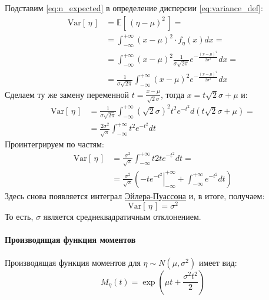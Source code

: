 \documentclass[
  russian,
  a4paper,
]{article}
\let\oldparagraph\paragraph
\renewcommand{\paragraph}[1]{\oldparagraph{#1}\mbox{}}
\begin{document}
Подставим \ref{eq:n_expected} в определение дисперсии
\ref{eq:variance_def}: \[\begin{aligned}
    \mathrm{Var}\left[\, \eta \,\right] &= \mathbb{E}\left[\, (\eta - \mu)^2 \,\right] =\\
               &= \int_{-\infty}^{+\infty} (x-\mu)^2 \cdot f_{\eta}(x)dx =\\
               &= \int_{-\infty}^{+\infty}(x-\mu)^2 \frac{1}{\sigma\sqrt{2\pi}}e^{-\frac{(x-\mu)^2}{2\sigma^2}}dx =\\
               &= \frac{1}{\sigma\sqrt{2\pi}}\int_{-\infty}^{+\infty}(x-\mu)^2 e^{-\frac{(x-\mu)^2}{2\sigma^2}}dx
\end{aligned}\] Сделаем ту же замену переменной
\(t = \frac{x-\mu}{\sqrt{2}\sigma}\), тогда \(x = t\sqrt{2}\sigma+\mu\)
и: \[\begin{aligned}
    \mathrm{Var}\left[\, \eta \,\right] &= \frac{1}{\sigma\sqrt{2\pi}}
                \int_{-\infty}^{+\infty}(\sqrt{2}\sigma)^2 t^2 e^{-t^2}d(t\sqrt{2}\sigma+\mu) =\\
               &= \frac{2\sigma^2}{\sqrt{\pi}}\int_{-\infty}^{+\infty}t^2 e^{-t^2}dt
\end{aligned}\] Проинтегрируем по частям: \[\begin{aligned}
    \mathrm{Var}\left[\, \eta \,\right] &= \frac{\sigma^2}{\sqrt{\pi}}\int_{-\infty}^{+\infty}t 2t e^{-t^2} dt =\\
               &= \frac{\sigma^2}{\sqrt{\pi}}\left(\left. -t e^{-t^2} \right|_{-\infty}^{+\infty}
                 + \int_{-\infty}^{+\infty}e^{-t^2}dt\right)
\end{aligned}\] Здесь снова появляется интеграл
\href{https://ru.wikipedia.org/wiki/Гауссов_интеграл}{Эйлера-Пуассона}
и, в итоге, получаем: \[\boxed{
    \mathrm{Var}\left[\, \eta \,\right] = \sigma^2
}\] То есть, \(\sigma\) является среднеквадратичным отклонением.

\hypertarget{ux43fux440ux43eux438ux437ux432ux43eux434ux44fux449ux430ux44f-ux444ux443ux43dux43aux446ux438ux44f-ux43cux43eux43cux435ux43dux442ux43eux432-1}{%
\paragraph{Производящая функция
моментов}\label{ux43fux440ux43eux438ux437ux432ux43eux434ux44fux449ux430ux44f-ux444ux443ux43dux43aux446ux438ux44f-ux43cux43eux43cux435ux43dux442ux43eux432-1}}

Производящая функция моментов для \(\eta \sim N(\mu, \sigma^2)\) имеет
вид: \[M_\eta(t) = \exp\left(\mu t + \frac{\sigma^2 t^2}{2}\right)\]
\end{document}
